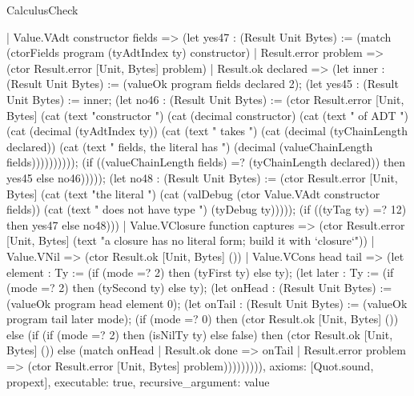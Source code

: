 \begin{lexlean}{CalculusCheck}
\begin{semanticmodule}
{    | Value.VAdt constructor fields => (let yes47 : (Result Unit Bytes) := (match (ctorFields program (tyAdtIndex ty) constructor)
      | Result.error problem => (ctor Result.error [Unit, Bytes] problem)
      | Result.ok declared => (let inner : (Result Unit Bytes) := (valueOk program fields declared 2); (let yes45 : (Result Unit Bytes) := inner; (let no46 : (Result Unit Bytes) := (ctor Result.error [Unit, Bytes] (cat (text "constructor ") (cat (decimal constructor) (cat (text " of ADT ") (cat (decimal (tyAdtIndex ty)) (cat (text " takes ") (cat (decimal (tyChainLength declared)) (cat (text " fields, the literal has ") (decimal (valueChainLength fields)))))))))); (if ((valueChainLength fields) =? (tyChainLength declared)) then yes45 else no46))))); (let no48 : (Result Unit Bytes) := (ctor Result.error [Unit, Bytes] (cat (text "the literal ") (cat (valDebug (ctor Value.VAdt constructor fields)) (cat (text " does not have type ") (tyDebug ty))))); (if ((tyTag ty) =? 12) then yes47 else no48)))
    | Value.VClosure function captures => (ctor Result.error [Unit, Bytes] (text "a closure has no literal form; build it with `closure`"))
    | Value.VNil => (ctor Result.ok [Unit, Bytes] ())
    | Value.VCons head tail => (let element : Ty := (if (mode =? 2) then (tyFirst ty) else ty); (let later : Ty := (if (mode =? 2) then (tySecond ty) else ty); (let onHead : (Result Unit Bytes) := (valueOk program head element 0); (let onTail : (Result Unit Bytes) := (valueOk program tail later mode); (if (mode =? 0) then (ctor Result.ok [Unit, Bytes] ()) else (if (if (mode =? 2) then (isNilTy ty) else false) then (ctor Result.ok [Unit, Bytes] ()) else (match onHead
      | Result.ok done => onTail
      | Result.error problem => (ctor Result.error [Unit, Bytes] problem))))))))),
  axioms: [Quot.sound, propext],
  executable: true,
  recursive_argument: value
}


\end{semanticmodule}
\end{lexlean}
